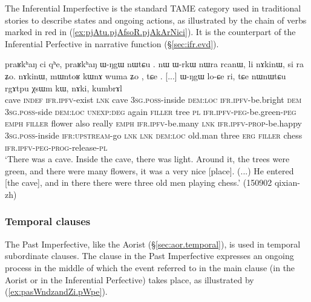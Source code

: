 The Inferential Imperfective is the standard TAME category used in traditional stories to describe states and ongoing actions, as illustrated by the chain of verbs marked in red in (\ref{ex:pjAtu.pjAfsoR.pjAkArNici}). It is the counterpart of the Inferential Perfective in narrative function  (§\ref{sec:ifr.evd}).

\begin{exe}
\ex \label{ex:pjAtu.pjAfsoR.pjAkArNici}
\gll praʁkʰaŋ ci  qʰe, praʁkʰaŋ ɯ-ŋgɯ nɯtɕu . nɯ ɯ-rkɯ nɯra rcanɯ, li nɤkinɯ, si ra  ʑo. nɤkinɯ, mɯntoʁ kɯnɤ wuma ʑo , tɕe . [...] ɯ-ŋgɯ lo-ɕe ri, tɕe nɯnɯtɕu rgɤtpu χsɯm kɯ, nɤki, kumbrɤl  \\
cave \textsc{indef} \textsc{ifr}.\textsc{ipfv}-exist \textsc{lnk} cave \textsc{3sg}.\textsc{poss}-inside \textsc{dem}:\textsc{loc} \textsc{ifr}.\textsc{ipfv}-be.bright \textsc{dem} \textsc{3sg}.\textsc{poss}-side \textsc{dem}:\textsc{loc} \textsc{unexp}:\textsc{deg} again \textsc{filler} tree \textsc{pl} \textsc{ifr}.\textsc{ipfv}-\textsc{peg}-be.green-\textsc{peg} \textsc{emph} \textsc{filler} flower also really \textsc{emph} \textsc{ifr}.\textsc{ipfv}-be.many \textsc{lnk} \textsc{ifr}.\textsc{ipfv}-\textsc{prop}-be.happy { } \textsc{3sg}.\textsc{poss}-inside \textsc{ifr}:\textsc{upstream}-go \textsc{lnk} \textsc{lnk} \textsc{dem}:\textsc{loc} old.man three \textsc{erg} \textsc{filler} chess \textsc{ifr}.\textsc{ipfv}-\textsc{peg}-\textsc{prog}-release-\textsc{pl} \\
\glt `There was a cave. Inside the cave, there was light. Around it, the trees were green, and there were many flowers, it was a very nice [place]. (...) He entered [the cave], and in there there were three old men playing chess.' (150902 qixian-zh)
\end{exe}


\subsubsection{Temporal clauses} \label{sec:pst.ifr.ipfv.temporal}
The Past Imperfective, like the Aorist (§\ref{sec:aor.temporal}), is used in temporal subordinate clauses. The clause in the Past Imperfective expresses an ongoing process in the middle of which the event referred to in the main clause (in the Aorist or in the Inferential Perfective) takes place, as illustrated by (\ref{ex:pasWndzandZi.pWpe}).


